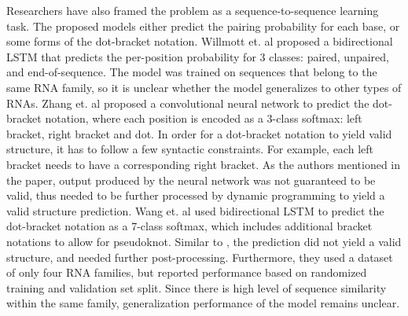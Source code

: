 \documentclass{article}
\begin{document}
Researchers have also framed the problem as a sequence-to-sequence learning task.
The proposed models either predict the pairing probability for each base,
or some forms of the dot-bracket notation.
Willmott et. al\cite{willmottstate} proposed a bidirectional LSTM that predicts
the per-position probability for 3 classes: paired, unpaired, and end-of-sequence.
The model was trained on sequences that belong to the same RNA family,
so it is unclear whether the model generalizes to other types of RNAs.
Zhang et. al\cite{zhang2019new} proposed a convolutional neural network to predict
the dot-bracket notation, where each position is encoded as a 3-class softmax: left bracket, right bracket and dot.
In order for a dot-bracket notation to yield valid structure, it has to follow a few syntactic constraints.
For example, each left bracket needs to have a corresponding right bracket.
As the authors mentioned in the paper, output produced by the neural network
was not guaranteed to be valid, thus needed to be further processed by dynamic programming
to yield a valid structure prediction.
Wang et. al\cite{wang2019dmfold} used bidirectional LSTM to predict the dot-bracket notation as a
7-class softmax, which includes additional bracket notations to allow for pseudoknot.
Similar to \cite{zhang2019new}, the prediction did not yield a
valid structure, and needed further post-processing.
Furthermore, they used a dataset of only four RNA families,
but reported performance based on randomized training and validation set split.
Since there is high level of sequence similarity within the same family,
generalization performance of the model remains unclear.






\end{document}
